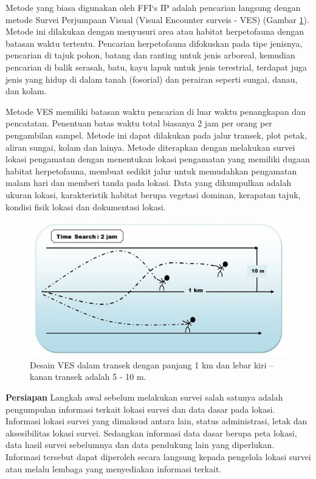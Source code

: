 \documentclass[
]{book}
\begin{document}
Metode yang biasa digunakan oleh FFI`s IP adalah pencarian langsung dengan metode Survei Perjumpaan Visual (Visual Encounter surveis - VES) (Gambar \ref{fig:figves}). Metode ini dilakukan dengan menyusuri area atau habitat herpetofauna dengan batasan waktu tertentu. Pencarian herpetofauna difokuskan pada tipe jenisnya, pencarian di tajuk pohon, batang dan ranting untuk jenis arboreal, kemudian pencarian di balik serasah, batu, kayu lapuk untuk jenis terestrial, terdapat juga jenis yang hidup di dalam tanah (fosorial) dan perairan seperti sungai, danau, dan kolam.

Metode VES memiliki batasan waktu pencarian di luar waktu penangkapan dan pencatatan. Penentuan batas waktu total biasanya 2 jam per orang per pengambilan sampel. Metode ini dapat dilakukan pada jalur transek, plot petak, aliran sungai, kolam dan lainya. Metode diterapkan dengan melakukan survei lokasi pengamatan dengan menentukan lokasi pengamatan yang memiliki dugaan habitat herpetofauna, membuat sedikit jalur untuk memudahkan pengamatan malam hari dan memberi tanda pada lokasi. Data yang dikumpulkan adalah ukuran lokasi, karakteristik habitat berupa vegetasi dominan, kerapatan tajuk, kondisi fisik lokasi dan dokumentasi lokasi.

\begin{figure}

{\centering \includegraphics[width=1\linewidth]{images/ves_ilustration} 

}

\caption{Desain VES dalam transek dengan panjang 1 km dan lebar kiri – kanan transek adalah 5 - 10 m.}\label{fig:figves}
\end{figure}

\textbf{Persiapan}
Langkah awal sebelum melakukan survei salah satunya adalah pengumpulan informasi terkait lokasi survei dan data dasar pada lokasi. Informasi lokasi survei yang dimaksud antara lain, status administrasi, letak dan aksesibilitas lokasi survei. Sedangkan informasi data dasar berupa peta lokasi, data hasil survei sebelumnya dan data pendukung lain yang diperlukan. Informasi tersebut dapat diperoleh secara langsung kepada pengelola lokasi survei atau melalu lembaga yang menyediakan informasi terkait.
\end{document}
